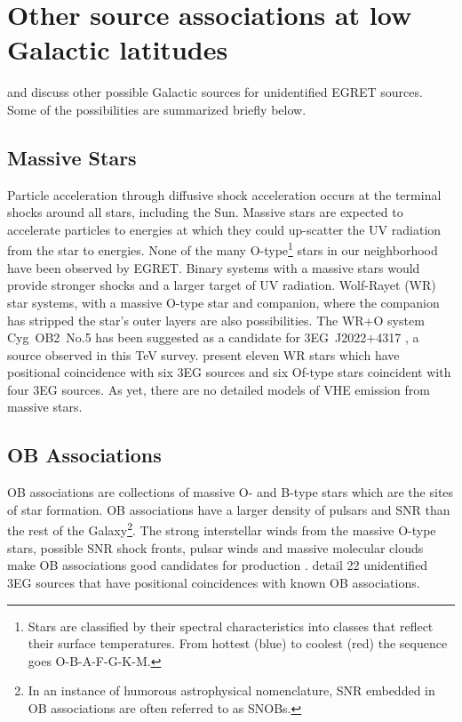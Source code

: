 \section{Other source associations at low Galactic latitudes}
\label{SEC::SOURCES::GALACTIC}

\citet{REF::GRENIER::TEXAS2002} and \citet{REF::ROMERO::AA1999}
discuss other possible Galactic sources for unidentified EGRET
sources. Some of the possibilities are summarized briefly below.

\subsection{Massive Stars}
\label{SEC::SOURCES::MASSIVESTARS}

Particle acceleration through diffusive shock acceleration occurs at
the terminal shocks around all stars, including the Sun. Massive stars
are expected to accelerate particles to energies at which they could
up-scatter the UV radiation from the star to \Gray energies. None of
the many O-type\footnote{Stars are classified by their spectral
characteristics into classes that reflect their surface
temperatures. From hottest (blue) to coolest (red) the sequence goes
O-B-A-F-G-K-M.} stars in our neighborhood have been observed by
EGRET. Binary systems with a massive stars would provide stronger
shocks and a larger target of UV radiation. Wolf-Rayet (WR) star
systems, with a massive O-type star and companion, where the companion
has stripped the star's outer layers are also possibilities. The WR+O
system Cyg~OB2~No.5 has been suggested as a candidate for
3EG~J2022$+$4317 \citep{REF::BENAGLIA::AA2001}, a source observed in
this TeV survey. \citet{REF::ROMERO::AA1999} present eleven WR stars
which have positional coincidence with six 3EG sources and six Of-type
stars coincident with four 3EG sources. As yet, there are no detailed
models of VHE emission from massive stars.

\subsection{OB Associations}
\label{SEC::SOURCES::OB}

OB associations are collections of massive O- and B-type stars which
are the sites of star formation. OB associations have a larger density
of pulsars and SNR than the rest of the Galaxy\footnote{In an instance
of humorous astrophysical nomenclature, SNR embedded in OB
associations are often referred to as SNOBs.}. The strong interstellar
winds from the massive O-type stars, possible SNR shock fronts, pulsar
winds and massive molecular clouds make OB associations good
candidates for \Gray production \citep{REF::KAARET::APJ1996}. 
\citet{REF::ROMERO::AA1999} detail 22 unidentified 3EG sources that have 
positional coincidences with known OB associations.


